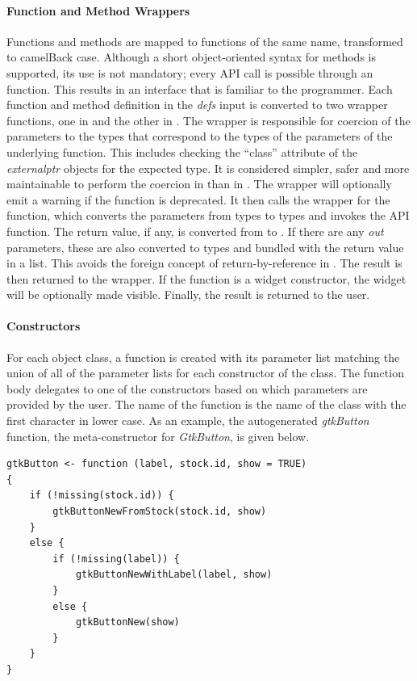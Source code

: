 \documentclass[article]{jss}
\begin{document}
\paragraph{Function and Method Wrappers}

Functions and methods are mapped to  functions of the same name, 
transformed to camelBack case. Although a short object-oriented
syntax for methods is supported, its use is not mandatory; every API call
is possible through an  function. This results in an interface
that is familiar to the  programmer. Each function and method 
definition in the \emph{defs} input is converted
to two wrapper functions, one in  and the other in . 
The  wrapper is responsible for coercion of the parameters to
the  types that correspond to the  types of the parameters
of the underlying  function. This includes checking the ``class''
attribute of the \emph{externalptr} objects for the expected type. 
It is considered simpler, safer and more
maintainable to perform the coercion in  than in . The 
 wrapper will optionally emit a warning if the function is deprecated.
It then calls the  wrapper for the function, which 
converts the parameters from  types to  types and
invokes the API function. The return value, if any, is converted from 
to . If there are any \emph{out} parameters, these are also converted
to  types and bundled with the return value in a list. This avoids 
the foreign concept of return-by-reference in . The result
is then returned to the  wrapper. If the function is a widget
constructor, the widget will be optionally made visible. Finally, the result
is returned to the user. 

\paragraph{Constructors}

For each object class, a function is created with its parameter list matching 
the union of all of the parameter lists for each constructor of the class.
The function body delegates to one of the constructors based on which
parameters are provided by the user. The name of the function is the name
of the class with the first character in lower case. As an example, the 
autogenerated \emph{gtkButton} function, the meta-constructor for \emph{GtkButton},
is given below.
\begin{verbatim}
gtkButton <- function (label, stock.id, show = TRUE) 
{
    if (!missing(stock.id)) {
        gtkButtonNewFromStock(stock.id, show)
    }
    else {
        if (!missing(label)) {
            gtkButtonNewWithLabel(label, show)
        }
        else {
            gtkButtonNew(show)
        }
    }
}
\end{verbatim}
\end{document}

